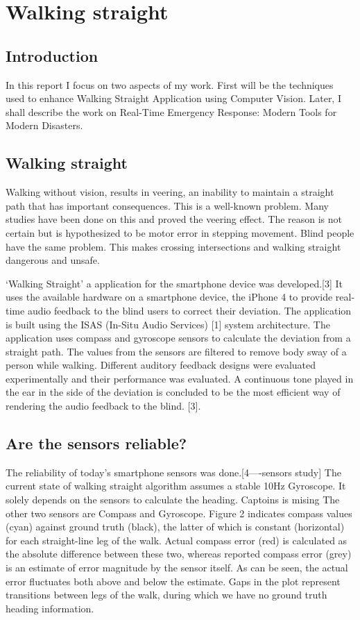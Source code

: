 \chapter{Walking straight}
\label{chap:intro}

\section{Introduction}

In this report I focus on two aspects of my work. First will be the techniques used to enhance Walking Straight Application using Computer Vision. Later, I shall describe the work on Real-Time Emergency Response: Modern Tools for Modern Disasters.

\section{Walking straight}
\label{sec:xrefs}

Walking without vision, results in veering, an inability to maintain a straight path that has important consequences. This is a well-known problem. Many studies have been done on this and proved the veering effect. The reason is not certain but is hypothesized to be motor error in stepping movement.  Blind people have the same problem. This makes crossing intersections and walking straight dangerous and unsafe.

‘Walking Straight’ a application for the smartphone device was developed.[3] It uses the available hardware on a smartphone device, the iPhone 4 to provide real-time audio feedback to the blind users to correct their deviation. The application is built using the ISAS (In-Situ Audio Services) [1] system architecture. The application uses compass and gyroscope sensors to calculate the deviation from a straight path. The values from the sensors are filtered to remove body sway of a person while walking. Different auditory feedback designs were evaluated experimentally and their performance was evaluated. A continuous tone played in the ear in the side of the deviation is concluded to be the most efficient way of rendering the audio feedback to the blind. [3].

\section{Are the sensors reliable?}

The reliability of today’s smartphone sensors was done.[4----sensors study] The current state of walking straight algorithm assumes a stable 10Hz Gyroscope. It solely depends on the sensors to calculate the heading.  
Captoins is mising
The other two sensors are Compass and Gyroscope. Figure 2 indicates compass values (cyan) against ground truth (black), the latter of which is constant (horizontal) for each straight-line leg of the walk. Actual compass error (red) is calculated as the absolute difference between these two, whereas reported compass error (grey) is an estimate of error magnitude by the sensor itself. As can be seen, the actual error fluctuates both above and below the estimate. Gaps in the plot represent transitions between legs of the walk, during which we have no ground truth heading information.

